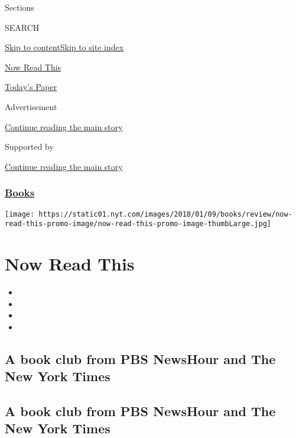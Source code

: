 Sections

SEARCH

\protect\hyperlink{site-content}{Skip to
content}\protect\hyperlink{site-index}{Skip to site index}

\href{https://www.nytimes.com/spotlight/now-read-this}{Now Read This}

\href{https://myaccount.nytimes.com/auth/login?response_type=cookie\&client_id=vi}{}

\href{https://www.nytimes.com/section/todayspaper}{Today's Paper}

Advertisement

\protect\hyperlink{after-top}{Continue reading the main story}

Supported by

\protect\hyperlink{after-sponsor}{Continue reading the main story}

\hypertarget{books}{%
\subsubsection{\texorpdfstring{\href{/section/books}{Books}}{Books}}\label{books}}

\texttt{[image: https://static01.nyt.com/images/2018/01/09/books/review/now-read-this-promo-image/now-read-this-promo-image-thumbLarge.jpg]}

\hypertarget{now-read-this}{%
\section{Now Read This}\label{now-read-this}}

\begin{itemize}
\item
\item
\item
\item
\end{itemize}

\hypertarget{a-book-club-from-pbs-newshour-and-the-new-york-times}{%
\subsection{A book club from PBS NewsHour and The New York
Times}\label{a-book-club-from-pbs-newshour-and-the-new-york-times}}

\hypertarget{a-book-club-from-pbs-newshour-and-the-new-york-times-1}{%
\subsection{A book club from PBS NewsHour and The New York
Times}\label{a-book-club-from-pbs-newshour-and-the-new-york-times-1}}

